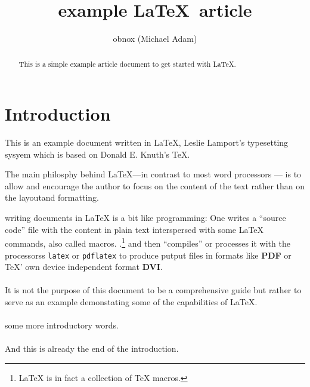\documentclass{article}
\title{example \LaTeX\ article}
\author{obnox (Michael Adam)}
\begin{document}
\maketitle

\begin{abstract}

    This is a simple  example article document to get started with  {\LaTeX}.

\end{abstract}

\tableofcontents

\section*{Introduction}

This is an example document written in {\LaTeX}, Leslie Lamport's typesetting
sysyem which is based on Donald E. Knuth's {\TeX}.

The main philosphy behind {\LaTeX}---in contrast to most word processors --- is to allow and encourage the author to
focus on the content of the text rather than on the layoutand formatting.

writing documents in {\LaTeX} is a bit like programming: One writes a ``source code''  file with the content in plain text
interspersed with some {\LaTeX} commands, also called macros. .\footnote{{\LaTeX} is in fact a collection of {\TeX} macros.}\label{fn:macros}
and then ``compiles'' or processes it with the processorss \verb|latex| or \verb|pdflatex| to produce
putput files in formats like \textbf{PDF} or {\TeX}' own device independent format \textbf{DVI}.

\paragraph{} It is not the purpose of this document to be a comprehensive guide but rather to serve as an example demonstating some of the capabilities of  {\LaTeX}.


\paragraph{} some more introductory words.

\paragraph{} And this is already the end of the introduction.
\end{document}
